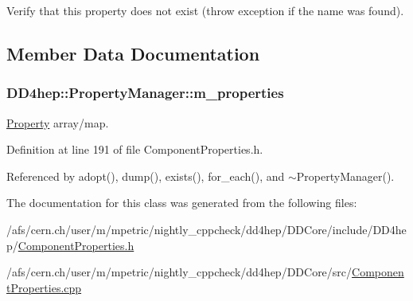 Verify that this property does not exist (throw exception if the name was found). 

\subsection{Member Data Documentation}
\hypertarget{class_d_d4hep_1_1_property_manager_af966b46276f15f24b36f7e88006bd098}{
\subsubsection[{m\_\-properties}]{ {\bf DD4hep::PropertyManager::m\_\-properties}}}
\label{class_d_d4hep_1_1_property_manager_af966b46276f15f24b36f7e88006bd098}


\hyperlink{class_d_d4hep_1_1_property}{Property} array/map. 

Definition at line 191 of file ComponentProperties.h.

Referenced by adopt(), dump(), exists(), for\_\-each(), and $\sim$PropertyManager().

The documentation for this class was generated from the following files:\begin{DoxyCompactItemize}
\item 
/afs/cern.ch/user/m/mpetric/nightly\_\-cppcheck/dd4hep/DDCore/include/DD4hep/\hyperlink{_component_properties_8h}{ComponentProperties.h}\item 
/afs/cern.ch/user/m/mpetric/nightly\_\-cppcheck/dd4hep/DDCore/src/\hyperlink{_component_properties_8cpp}{ComponentProperties.cpp}\end{DoxyCompactItemize}
